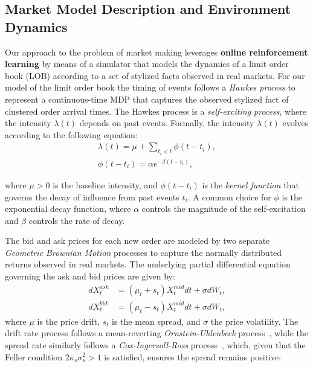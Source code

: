 \subsection{Market Model Description and Environment Dynamics}
\label{subsec:market-model-description-and-environment-dynamics}
Our approach to the problem of market making leverages \textbf{online reinforcement learning} by means of a simulator that models the dynamics of
a limit order book (LOB) according to a set of stylized facts observed in real markets.
For our model of the limit order book the timing of events follows a \textit{Hawkes process}
to represent a continuous-time MDP that captures the observed stylized fact of clustered order arrival times.
The Hawkes process is a \textit{self-exciting process}, where the intensity \( \lambda(t) \) depends on past events.
Formally, the intensity \( \lambda(t) \) evolves according to the following equation:
\begin{equation*}
    \begin{aligned}
        \lambda(t) = \mu + \sum_{t_i < t} \phi(t - t_i),\\
        \phi(t - t_i) = \alpha e^{-\beta (t - t_i)},
    \end{aligned}
\end{equation*}

where \( \mu > 0 \) is the baseline intensity, and \( \phi(t - t_i) \) is the \textit{kernel function} that governs the decay of influence from past events \( t_i \).
A common choice for \( \phi \) is the exponential decay function, where \(\alpha\) controls the magnitude of the self-excitation and \(\beta\) controls the rate of decay.

The bid and ask prices for each new order are modeled by two separate \textit{Geometric Brownian Motion} processes
to capture the normally distributed returns observed in real markets.
The underlying partial differential equation governing the ask and bid prices are given by:
\begin{equation*}
    \begin{aligned}
        dX_{t}^{ask} &= (\mu_t + s_t) X_{t}^{mid} dt + \sigma dW_t,\\
        dX_{t}^{bid} &= (\mu_t - s_t) X_{t}^{mid} dt + \sigma dW_t,
    \end{aligned}
    \label{eq:gbm}
\end{equation*}
where $\mu$ is the price drift, $s_t$ is the mean spread, and $\sigma$ the price volatility.
The drift rate process follows a mean-reverting \textit{Ornstein-Uhlenbeck} process~\cite{Ornstein1930},
while the spread rate similarly follows a \textit{Cox-Ingersoll-Ross} process~\cite{Cox1985}, which, given that the
Feller condition $2\kappa_s \sigma_s^2 > 1$ is satisfied, ensures the spread remains positive:

